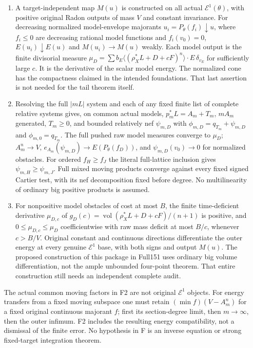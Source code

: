 \documentclass[10pt]{article}
\newcommand{\vol}{\operatorname{vol}}
\newcommand{\E}{\mathcal E}
\begin{document}
\begin{enumerate}
\item[F1.] A target-independent map $M(u)$ is constructed on all actual
$\E^1(\theta)$, with positive original Radon outputs of mass $V$ and
constant invariance. For decreasing normalized model-envelope majorants
$u_i=P_\theta(f_i)\downarrow u$, where $f_i\leq0$ are decreasing rational
model functions and $f_i(v_0)=0$, $E(u_i)\downarrow E(u)$ and
$M(u_i)\to M(u)$ weakly. Each model output is the finite divisorial
measure $\mu_D=\sum b_E\langle(\rho_X^*L+D+cF)^n\rangle\cdot E\,
\delta_{v_E}$ for sufficiently large $c$. It is the derivative of
the scalar model energy. The normalized cone has the compactness claimed
in the intended foundations. That last assertion is not needed for the
tail theorem itself.
\item[F2.] Resolving the full $|mL|$ system and each of any fixed finite
list of complete relative systems gives, on common actual models,
$p_m^*L=A_m+T_m$, $mA_m$ generated, $T_m\geq0$, and bounded relatively
nef $\psi_{m,D}$ with
$\phi_{m,D}=q_{T_m}+\psi_{m,D}$ and $\phi_{m,0}=q_{T_m}$.
The full pushed raw model measures converge to $\mu_D$;
$A_m^n\to V$, $e_{A_m}(\psi_{m,D})\to E(P_\theta(f_D))$,
and $\psi_{m,D}(v_0)\to0$ for normalized obstacles.
For ordered $f_H\geq f_J$ the literal full-lattice inclusion gives
$\psi_{m,H}\geq\psi_{m,J}$. Full mixed moving products converge
against every fixed signed Cartier test, with its nef decomposition fixed
before degree. No multilinearity of ordinary big positive products is assumed.
\item[F3.] For nonpositive model obstacles of cost at most $B$, the finite
time-deficient derivative $\mu_{D,c}$ of
$g_D(c)=\vol(\rho_X^*L+D+cF)/(n+1)$ is positive, and
$0\leq\mu_{D,c}\leq\mu_D$ coefficientwise with raw mass deficit
at most $B/c$, whenever $c>B/V$. Original constant and continuous
directions differentiate the outer energy at every genuine $\E^1$
base, with both signs and output $M(u)$. The proposed construction of
this package in Full151 uses ordinary big volume differentiation,
not the ample unbounded four-point theorem. That entire construction
still needs an independent complete audit.
\end{enumerate}
The actual common moving factors in F2 are not original $\E^1$ objects.
For energy transfers from a fixed moving subspace one must retain
$(\min f)(V-A_m^n)$ for a fixed original continuous majorant $f$;
first its section-degree limit, then $m\to\infty$, then the outer
infimum. F2 includes the resulting energy compatibility, not a dismissal
of the finite error. No hypothesis in F is an inverse equation or strong
fixed-target integration theorem.
\end{document}
